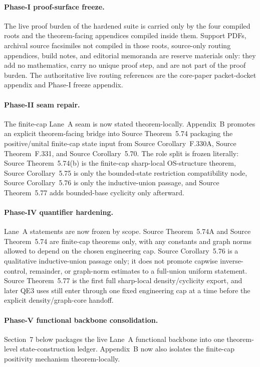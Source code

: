 \documentclass[preprint,aip,jmp,amsmath,amssymb,nofootinbib]{revtex4-2}
\begin{document}
\paragraph{Phase-I proof-surface freeze.}
The live proof burden of the hardened suite is carried only by the four compiled roots and the theorem-facing appendices compiled inside them. Support PDFs, archival source facsimiles not compiled in those roots, source-only routing appendices, build notes, and editorial memoranda are reserve materials only: they add no mathematics, carry no unique proof step, and are not part of the proof burden. The authoritative live routing references are the core-paper packet-docket appendix and Phase-I freeze appendix.

\paragraph{Phase-II seam repair.}
The finite-cap Lane~A seam is now stated theorem-locally. Appendix~B promotes an explicit theorem-facing bridge into Source Theorem~5.74 packaging the positive/unital finite-cap state input from Source Corollary~F.330A, Source Theorem~F.331, and Source Corollary~5.70. The role split is frozen literally: Source Theorem~5.74(b) is the finite-cap sharp-local OS-structure theorem, Source Corollary~5.75 is only the bounded-state restriction compatibility node, Source Corollary~5.76 is only the inductive-union passage, and Source Theorem~5.77 adds bounded-base cyclicity only afterward.

\paragraph{Phase-IV quantifier hardening.}
Lane~A statements are now frozen by scope. Source Theorem~5.74A and Source Theorem~5.74 are finite-cap theorems only, with any constants and graph norms allowed to depend on the chosen engineering cap. Source Corollary~5.76 is a qualitative inductive-union passage only; it does not promote capwise inverse-control, remainder, or graph-norm estimates to a full-union uniform statement. Source Theorem~5.77 is the first full sharp-local density/cyclicity export, and later QE3 uses still enter through one fixed engineering cap at a time before the explicit density/graph-core handoff.


\paragraph{Phase-V functional backbone consolidation.}
Section~7 below packages the live Lane~A functional backbone into one theorem-level state-construction ledger. Appendix~B now also isolates the finite-cap positivity mechanism theorem-locally.
\end{document}
